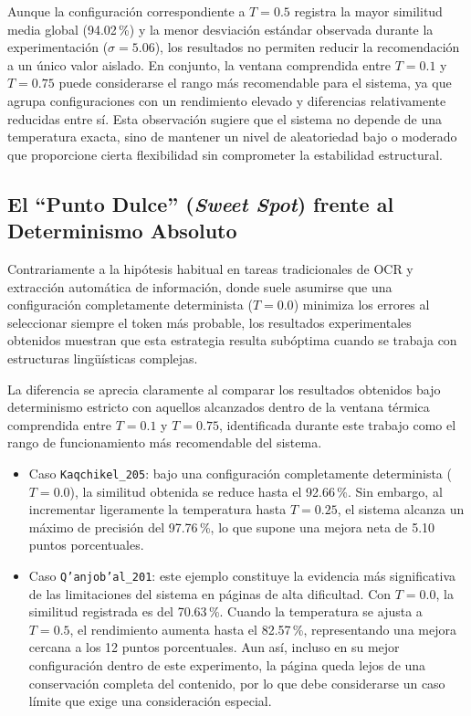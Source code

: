 Aunque la configuración correspondiente a \(T=0.5\) registra la mayor similitud media global (94.02\,\%) y la menor desviación estándar observada durante la experimentación (\(\sigma = 5.06\)), los resultados no permiten reducir la recomendación a un único valor aislado. En conjunto, la ventana comprendida entre \(T=0.1\) y \(T=0.75\) puede considerarse el rango más recomendable para el sistema, ya que agrupa configuraciones con un rendimiento elevado y diferencias relativamente reducidas entre sí. Esta observación sugiere que el sistema no depende de una temperatura exacta, sino de mantener un nivel de aleatoriedad bajo o moderado que proporcione cierta flexibilidad sin comprometer la estabilidad estructural.


\subsection{El ``Punto Dulce'' (\textit{Sweet Spot}) frente al Determinismo Absoluto}

Contrariamente a la hipótesis habitual en tareas tradicionales de OCR y extracción automática de información, donde suele asumirse que una configuración completamente determinista (\(T=0.0\)) minimiza los errores al seleccionar siempre el token más probable, los resultados experimentales obtenidos muestran que esta estrategia resulta subóptima cuando se trabaja con estructuras lingüísticas complejas.

La diferencia se aprecia claramente al comparar los resultados obtenidos bajo determinismo estricto con aquellos alcanzados dentro de la ventana térmica comprendida entre \(T=0.1\) y \(T=0.75\), identificada durante este trabajo como el rango de funcionamiento más recomendable del sistema.
\begin{itemize}
    \item Caso \texttt{Kaqchikel\_205}: bajo una configuración completamente determinista (\(T=0.0\)), la similitud obtenida se reduce hasta el 92.66\,\%. Sin embargo, al incrementar ligeramente la temperatura hasta \(T=0.25\), el sistema alcanza un máximo de precisión del 97.76\,\%, lo que supone una mejora neta de 5.10 puntos porcentuales.

    \item Caso \texttt{Q’anjob’al\_201}: este ejemplo constituye la evidencia más significativa de las limitaciones del sistema en páginas de alta dificultad. Con \(T=0.0\), la similitud registrada es del 70.63\,\%. Cuando la temperatura se ajusta a \(T=0.5\), el rendimiento aumenta hasta el 82.57\,\%, representando una mejora cercana a los 12 puntos porcentuales. Aun así, incluso en su mejor configuración dentro de este experimento, la página queda lejos de una conservación completa del contenido, por lo que debe considerarse un caso límite que exige una consideración especial.
\end{itemize}

